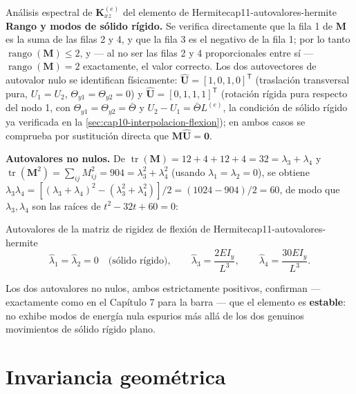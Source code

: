 \begin{ejemplo}{Análisis espectral de \texorpdfstring{$\bm K^{(e)}_{xz}$}{K\_xz} del elemento de Hermite}{cap11-autovalores-hermite}
\textbf{Rango y modos de sólido rígido.} Se verifica directamente que la fila 1 de $\bm M$ es la suma de las filas 2 y 4, y que la fila 3 es el negativo de la fila 1; por lo tanto $\operatorname{rango}(\bm M)\leq2$, y --- al no ser las filas 2 y 4 proporcionales entre sí --- $\operatorname{rango}(\bm M)=2$ exactamente, el valor correcto. Los dos autovectores de autovalor nulo se identifican físicamente: $\hat{\bm U}=[1,0,1,0]^{\mathsf T}$ (traslación transversal pura, $U_1=U_2$, $\Theta_{y1}=\Theta_{y2}=0$) y $\hat{\bm U}=[0,1,1,1]^{\mathsf T}$ (rotación rígida pura respecto del nodo 1, con $\Theta_{y1}=\Theta_{y2}=\bar\Theta$ y $U_2-U_1=\bar\Theta L^{(e)}$, la condición de sólido rígido ya verificada en la \cref{sec:cap10-interpolacion-flexion}); en ambos casos se comprueba por sustitución directa que $\bm M\hat{\bm U}=\bm 0$.

\textbf{Autovalores no nulos.} De $\operatorname{tr}(\bm M)=12+4+12+4=32=\lambda_3+\lambda_4$ y $\operatorname{tr}(\bm M^2)=\sum_{ij}M_{ij}^2=904=\lambda_3^2+\lambda_4^2$ (usando $\lambda_1=\lambda_2=0$), se obtiene $\lambda_3\lambda_4=\left[(\lambda_3+\lambda_4)^2-(\lambda_3^2+\lambda_4^2)\right]/2=(1024-904)/2=60$, de modo que $\lambda_3,\lambda_4$ son las raíces de $t^2-32t+60=0$:

\begin{ecnimportante}{Autovalores de la matriz de rigidez de flexión de Hermite}{cap11-autovalores-hermite}
\[
\hat\lambda_1=\hat\lambda_2=0 \quad\text{(sólido rígido)}, \qquad
\hat\lambda_3 = \frac{2EI_y}{L^3}, \qquad \hat\lambda_4 = \frac{30EI_y}{L^3} .
\]
\end{ecnimportante}

Los dos autovalores no nulos, ambos estrictamente positivos, confirman --- exactamente como en el Capítulo 7 para la barra --- que el elemento es \textbf{estable}: no exhibe modos de energía nula espurios más allá de los dos genuinos movimientos de sólido rígido plano.
\end{ejemplo}

\section{Invariancia geométrica}

